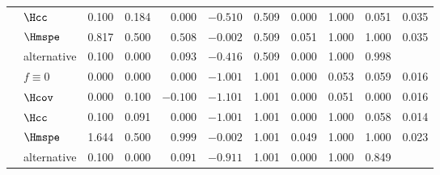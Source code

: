 \begin{table}[htbp]
\begin{tabular}{rlrrrrrrrrr}
 & $\Hcc$ & 0.100 & 0.184 & $0.000$ & $-0.510$ & 0.509 & 0.000 & 1.000 & \cellcolor{black!10}0.051 & 0.035 \\
 & $\Hmspe$ & 0.817 & 0.500 & $0.508$ & $-0.002$ & 0.509 & \cellcolor{black!10}0.051 & 1.000 & 1.000 & 0.035 \\
 & alternative & 0.100 & 0.000 & $0.093$ & $-0.416$ & 0.509 & 0.000 & 1.000 & 0.998 &  \\
\addlinespace
1.0 & $f\equiv0$ & 0.000 & 0.000 & $0.000$ & $-1.001$ & 1.001 & 0.000 & 0.053 & \cellcolor{black!10}0.059 & 0.016 \\
 & $\Hcov$ & 0.000 & 0.100 & $-0.100$ & $-1.101$ & 1.001 & 0.000 & \cellcolor{black!10}0.051 & 0.000 & 0.016 \\
 & $\Hcc$ & 0.100 & 0.091 & $0.000$ & $-1.001$ & 1.001 & 0.000 & 1.000 & \cellcolor{black!10}0.058 & 0.014 \\
 & $\Hmspe$ & 1.644 & 0.500 & $0.999$ & $-0.002$ & 1.001 & \cellcolor{black!10}0.049 & 1.000 & 1.000 & 0.023 \\
 & alternative & 0.100 & 0.000 & $0.091$ & $-0.911$ & 1.001 & 0.000 & 1.000 & 0.849 &  \\
\bottomrule
\end{tabular}
\end{table}
